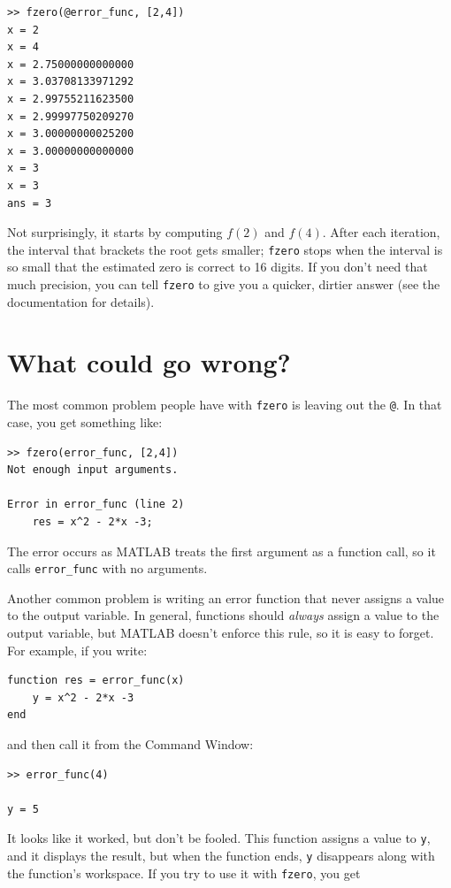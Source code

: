 \documentclass{book}
\begin{document}
\begin{verbatim}
>> fzero(@error_func, [2,4])
x = 2
x = 4
x = 2.75000000000000
x = 3.03708133971292
x = 2.99755211623500
x = 2.99997750209270
x = 3.00000000025200
x = 3.00000000000000
x = 3
x = 3
ans = 3
\end{verbatim}

Not surprisingly, it starts by computing $f(2)$ and $f(4)$.  After
each iteration, the interval that brackets the root gets smaller;
{\tt fzero} stops when the interval is so small that the estimated
zero is correct to 16 digits.  If you
don't need that much precision, you can tell {\tt fzero} to give
you a quicker, dirtier answer (see the documentation for details).


\section{What could go wrong?}

The most common problem people have with {\tt fzero} is leaving
out the {\tt @}.  In that case, you get something like:

\begin{verbatim}
>> fzero(error_func, [2,4])
Not enough input arguments.

Error in error_func (line 2)
    res = x^2 - 2*x -3;
\end{verbatim}

The error occurs as MATLAB treats the first argument as a function call, 
so it calls {\tt error\_func} with no arguments.  

Another common problem is writing an error function that never
assigns a value to the output variable.  In general, functions should
{\em always} assign a value to the output variable, but MATLAB doesn't
enforce this rule, so it is easy to forget.  For example, if you
write:

\begin{verbatim}
function res = error_func(x)
    y = x^2 - 2*x -3
end
\end{verbatim}

and then call it from the Command Window:

\begin{verbatim}
>> error_func(4)

y = 5
\end{verbatim}

It looks like it worked, but don't be fooled.  This function assigns
a value to {\tt y}, and it displays the result, but when the function
ends, {\tt y} disappears along with the function's workspace.
If you try to use it with {\tt fzero}, you get
\end{document}
